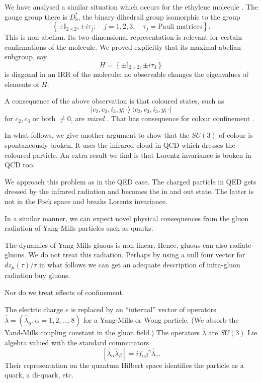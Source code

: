 We have analysed a similar situation which occurs for the ethylene molecule \cite{key10}. The gauge group there is $D^\ast_8$, the binary dihedrall group isomorphic to the group
\begin{equation}
\left\{ \pm \mathbb{I}_{2 \times 2}, \pm i \tau_j :\quad j=1, 2, 3, \quad \tau_j = \text{Pauli matrices}\right\}.\label{chap1-eq3.2}
\end{equation}
This is non-abelian. Its two-dimensional representation is relevant for certain confirmations of the molecule. We proved explicitly that its maximal abelian subgroup, say
\begin{equation}
H = \left\{ \pm \mathbb{I}_{2 \times 2}, \pm  i \tau_3\right\}\label{chap1-eq3.3}
\end{equation}
is diagonal in an IRR of the molecule: no observable changes the eigenvalues of elements of $H$.

A consequence of the above observation is that coloured states, such as
\begin{equation}
|c_2, c_3, i_3, y; \cdot \rangle ~ \langle c_2, c_3, i_3, y; \cdot | \label{chap1-eq3.4}
\end{equation}
for $c_2, c_3$ or both $\neq 0$, are \textit{mixed} \cite{key4}. That has consequence for colour confinement \cite{key4}.

In what follows, we give another argument to show that the $SU(3)$ of colour is spontaneously broken. It uses the infrared cloud in QCD which dresses the coloured particle. An extra result we find is that Lorentz invariance is broken in QCD too.

We approach this problem as in the QED case. The charged particle in QED gets dressed by the infrared radiation and becomes the in and out state. The latter is not in the Fock space and breaks Lorentz invariance.

In a similar manner, we can expect novel physical consequences from the gluon radiation of Yang-Mills particles such as quarks.

The dynamics of Yang-Mills gluous is non-linear. Hence, gluous can also radiate gluons. We do not treat this radiation. Perhaps by using a null four vector for $dz_\mu (\tau)/\tau$ in what follows we can get an adequate description of infra-gluon radiation buy gluons.

Nor do we treat effects of confinement.

The electric charge $e$ is replaced by an ``internal'' vector of operators $\hat{\lambda}= (\hat{\lambda}_\alpha, \alpha = 1, 2, \ldots , 8)$ for a Yang-Mills or Wong \cite{key11} particle. (We absorb the Yand-Mills coupling constant in the gluon field.) The operators $\hat{\lambda}$ are $SU(3)$ Lie algebra valued with the standard commutators
\begin{equation}
\left[ \hat{\lambda}_\alpha \hat{\lambda}_\beta \right] = if_{\alpha \beta} {}^\gamma \hat{\lambda}_\gamma. \label{chap1-eq3.5}
\end{equation}
Their representation on the quantum Hilbert space identifies the particle as a quark, a di-quark, etc.

